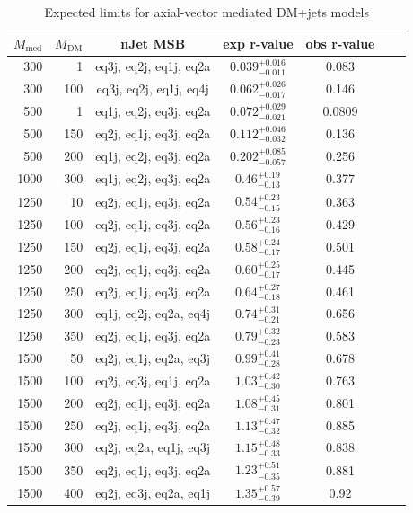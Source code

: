 \begin{table}
  \centering
  \begin{tabular}{rrccccc}
    \hline\hline
    $M_{\text{med}}$ & $M_{\text{DM}}$ & nJet MSB & exp r-value & obs r-value \\
    \hline
      300 &   1 & eq3j, eq2j, eq1j, eq2a & $0.039_{-0.011}^{+0.016}$ & 0.083 \\
      300 & 100 & eq3j, eq2j, eq1j, eq4j & $0.062_{-0.017}^{+0.026}$ & 0.146 \\
      500 &   1 & eq1j, eq2j, eq3j, eq2a & $0.072_{-0.021}^{+0.029}$ & 0.0809 \\
      500 & 150 & eq2j, eq1j, eq3j, eq2a & $0.112_{-0.032}^{+0.046}$ & 0.136 \\
      500 & 200 & eq1j, eq2j, eq3j, eq2a & $0.202_{-0.057}^{+0.085}$ & 0.256 \\
     1000 & 300 & eq1j, eq2j, eq3j, eq2a & $0.46_{-0.13}^{+0.19}$    & 0.377 \\
     1250 &  10 & eq2j, eq1j, eq3j, eq2a & $0.54_{-0.15}^{+0.23}$    & 0.363 \\
     1250 & 100 & eq2j, eq1j, eq3j, eq2a & $0.56_{-0.16}^{+0.23}$    & 0.429 \\
     1250 & 150 & eq2j, eq1j, eq3j, eq2a & $0.58_{-0.17}^{+0.24}$    & 0.501 \\
     1250 & 200 & eq2j, eq1j, eq3j, eq2a & $0.60_{-0.17}^{+0.25}$    & 0.445 \\
     1250 & 250 & eq2j, eq1j, eq3j, eq2a & $0.64_{-0.18}^{+0.27}$    & 0.461 \\
     1250 & 300 & eq1j, eq2j, eq2a, eq4j & $0.74_{-0.21}^{+0.31}$    & 0.656 \\
     1250 & 350 & eq2j, eq1j, eq3j, eq2a & $0.79_{-0.23}^{+0.32}$    & 0.583 \\
     1500 &  50 & eq2j, eq1j, eq2a, eq3j & $0.99_{-0.28}^{+0.41}$    & 0.678 \\
     1500 & 100 & eq2j, eq3j, eq1j, eq2a & $1.03_{-0.30}^{+0.42}$    & 0.763 \\
     1500 & 200 & eq2j, eq1j, eq3j, eq2a & $1.08_{-0.31}^{+0.45}$    & 0.801 \\
     1500 & 250 & eq2j, eq1j, eq3j, eq2a & $1.13_{-0.32}^{+0.47}$    & 0.885 \\
     1500 & 300 & eq2j, eq2a, eq1j, eq3j & $1.15_{-0.33}^{+0.48}$    & 0.838 \\
     1500 & 350 & eq2j, eq1j, eq3j, eq2a & $1.23_{-0.35}^{+0.51}$    & 0.881 \\
     1500 & 400 & eq2j, eq3j, eq2a, eq1j & $1.35_{-0.39}^{+0.57}$    & 0.92 \\
    \hline\hline
  \end{tabular}
  \caption{Expected limits for axial-vector mediated DM+jets models}
  \label{tab:DMAV_limits}
\end{table}

